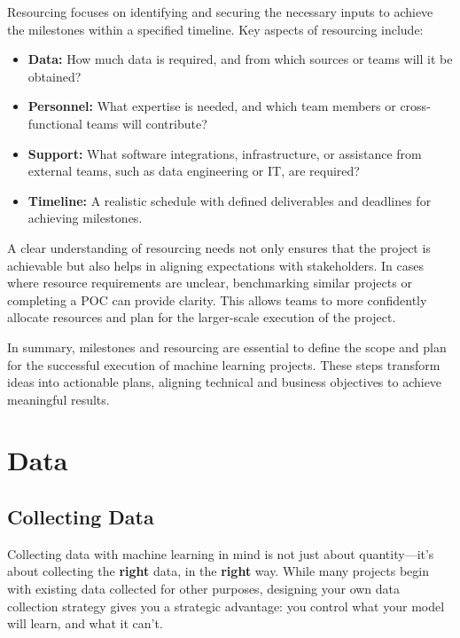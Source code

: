 \documentclass[12pt,openany]{book}
\begin{document}
Resourcing focuses on identifying and securing the necessary inputs to achieve the milestones within a specified timeline. Key aspects of resourcing include:
\begin{itemize}
    \item \textbf{Data:} How much data is required, and from which sources or teams will it be obtained?
    \item \textbf{Personnel:} What expertise is needed, and which team members or cross-functional teams will contribute?
    \item \textbf{Support:} What software integrations, infrastructure, or assistance from external teams, such as data engineering or IT, are required?
    \item \textbf{Timeline:} A realistic schedule with defined deliverables and deadlines for achieving milestones.
\end{itemize}

A clear understanding of resourcing needs not only ensures that the project is achievable but also helps in aligning expectations with stakeholders. In cases where resource requirements are unclear, benchmarking similar projects or completing a POC can provide clarity. This allows teams to more confidently allocate resources and plan for the larger-scale execution of the project. \newline

In summary, milestones and resourcing are essential to define the scope and plan for the successful execution of machine learning projects. These steps transform ideas into actionable plans, aligning technical and business objectives to achieve meaningful results.




\part{Data}


\chapter{Collecting Data}

Collecting data with machine learning in mind is not just about quantity—it's about collecting the \textbf{right} data, in the \textbf{right} way. While many projects begin with existing data collected for other purposes, designing your own data collection strategy gives you a strategic advantage: you control what your model will learn, and what it can’t.
\newline
\end{document}
